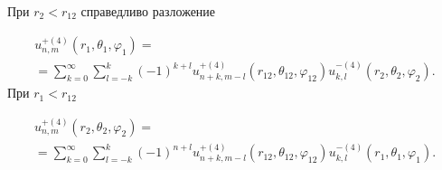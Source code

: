 %
%
%
%

\begin{theorem}
При ${r_2} < {r_{12}}$ справедливо разложение

\begin{multline}\label{eq:1:15}
u_{n,m}^{ + (4)}\left( {{r_1},{\theta _1},{\varphi _1}} \right) = \\
= \sum\limits_{k = 0}^\infty  {\sum\limits_{l =  - k}^k {{{( - 1)}^{k + l}}} } u_{n + k,m - l}^{ + (4)}\left( {{r_{12}},{\theta _{12}},{\varphi _{12}}} \right)u_{k,l}^{ - (4)}\left( {{r_2},{\theta _2},{\varphi _2}} \right).
\end{multline}
При  ${r_1} < {r_{12}}$

\begin{multline}
u_{n,m}^{ + (4)}\left( {{r_2},{\theta _2},{\varphi _2}} \right) = \\
= \sum\limits_{k = 0}^\infty  {\sum\limits_{l =  - k}^k {{{( - 1)}^{n + l}}} } u_{n + k,m - l}^{ + (4)}\left( {{r_{12}},{\theta _{12}},{\varphi _{12}}} \right)u_{k,l}^{ - (4)}\left( {{r_1},{\theta _1},{\varphi _1}} \right).
\label{eq:1:16a}
\end{multline}
\end{theorem}

